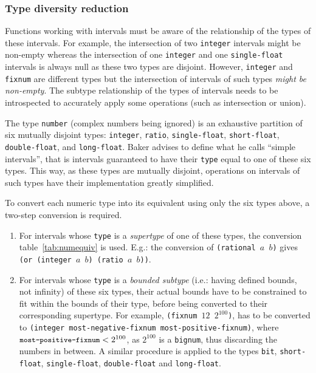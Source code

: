 \documentclass[format=sigconf]{acmart}
\newcommand\code[2][\small]{\sloppy\texttt{#1#2}}
\newcommand\mcode[2][\small]{\text{\code[#1]{#2}}}
\theoremstyle{definition}
\begin{document}
\subsubsection{Type diversity reduction}
\label{sec:tdred}
Functions working with intervals must be aware of the relationship of the types
of these intervals. For example, the intersection of two \code{integer}
intervals might be non-empty whereas the intersection of one \code{integer} and
one \code{single-float} intervals is always null as these two types are disjoint.
However, \code{integer} and \code{fixnum} are different types but the
intersection of intervals of such types \emph{might be non-empty}.
The subtype relationship of the types of intervals needs to be introspected to
accurately apply some operations (such as intersection or union).

The type \code{number} (complex numbers being ignored) is an exhaustive
partition of six mutually disjoint types: \code{integer}, \code{ratio},
\code{single-float}, \code{short-float}, \code{double-float}, and
\code{long-float}.
Baker advises to define what he calls ``simple intervals'', that is intervals
guaranteed to have their \code{type} equal to one of these six types. This way,
as these types are mutually disjoint, operations on intervals of such types have
their implementation greatly simplified.

To convert each numeric type into its equivalent using only the six types above,
a two-step conversion is required.
\begin{enumerate}
\item For intervals whose \code{type} is a \emph{supertype} of one of these
  types, the conversion table~\ref{tab:numequiv} is used. E.g.: the conversion
  of \code{(rational $a$ $b$)} gives \code{(or (integer $a$ $b$) (ratio $a$
    $b$))}.
\item For intervals whose \code{type} is a \emph{bounded subtype} (i.e.: having
  defined bounds, not infinity) of these six types, their actual bounds have to
  be constrained to fit within the bounds of their type, before being converted
  to their corresponding supertype. For example, \code{(fixnum $12$ $2^{100}$)},
  has to be converted to \code{(integer most-negative-fixnum
    most-positive-fixnum)}, where $\mcode{most-positive-fixnum} < 2^{100}$, as
  $2^{100}$ is a \code{bignum}, thus discarding the numbers in between.
  A similar procedure is applied to the types \code{bit}, \code{short-float},
  \code{single-float}, \code{double-float} and \code{long-float}.
\end{enumerate}
\end{document}
